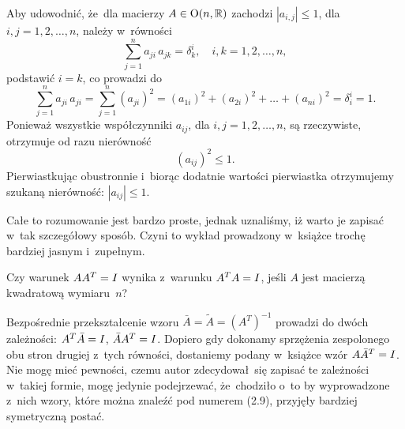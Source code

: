 \documentclass[a4paper,11pt]{article}
\begin{document}
\vspace{\spaceFour}





 Aby udowodnić, że~dla macierzy $A \in \mathbf{\mathrm{O}}( n, \mathbb{R} )$
zachodzi $| a_{ i, j } | \leq 1$, dla $i, j = 1, 2, \ldots, n$, należy w~równości
\begin{equation}
  \label{eq:Wojtynski-04}
  \sum_{ j = 1 }^{ n } a_{ j i } \, a_{ j k } = \delta^{ i }_{ k }, \quad
  i, k = 1, 2, \ldots, n,
\end{equation}
podstawić $i = k$, co prowadzi do
\begin{equation}
  \label{eq:Wojtynski-05}
  \sum_{ j = 1 }^{ n } a_{ j i } \, a_{ j i } =
  \sum_{ j = 1 }^{ n } ( a_{ j i } )^{ 2 } =
  ( a_{ 1 i } )^{ 2 } + ( a_{ 2 i } )^{ 2 } + \ldots + ( a_{ n i } )^{ 2 } =
  \delta^{ i }_{ i } = 1.
\end{equation}
Ponieważ wszystkie współczynniki $a_{ i j }$, dla $i, j = 1, 2, \ldots, n$, są
rzeczywiste, otrzymuje od razu nierówność
\begin{equation}
  \label{eq:Wojtynski-06}
  ( a_{ i j } )^{ 2 } \leq 1.
\end{equation}
Pierwiastkując obustronnie i~biorąc dodatnie wartości pierwiastka
otrzymujemy szukaną nierówność: $| a_{ i j } | \leq 1$.

Całe to rozumowanie jest bardzo proste, jednak uznaliśmy, iż warto je
zapisać w~tak szczegółowy sposób. Czyni to wykład prowadzony w~książce
trochę bardziej jasnym i~zupełnym.

\vspace{\spaceFour}





 Czy warunek $A A^{ T } = I$ wynika z~warunku
$A^{ T } A = I$, jeśli $A$ jest macierzą kwadratową wymiaru~$n$?

\vspace{\spaceFour}





 Bezpośrednie przekształcenie wzoru
$\bar{A} = \widetilde{A} = ( A^{ T } )^{ -1 }$ prowadzi do dwóch zależności:
$A^{ T } \bar{A} = I$, $\bar{A} A^{ T } = I$. Dopiero gdy
dokonamy sprzężenia zespolonego obu stron drugiej z~tych równości,
dostaniemy podany w~książce wzór $A \bar{A}^{ T } = I$. Nie mogę
mieć pewności, czemu autor zdecydował~się zapisać te zależności w~takiej
formie, mogę jedynie podejrzewać, że~chodziło o~to by wyprowadzone z~nich
wzory, które można znaleźć pod numerem (2.9), przyjęły bardziej symetryczną
postać.
\end{document}
